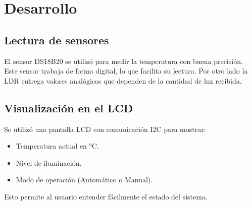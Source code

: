 \documentclass[conference]{IEEEtran}
\begin{document}
\section{Desarrollo}

\subsection{Lectura de sensores}
El sensor DS18B20 se utilizó para medir la temperatura con buena precisión. Este sensor trabaja
de forma digital, lo que facilita su lectura. Por otro lado la LDR entrega valores analógicos
que dependen de la cantidad de luz recibida.

\subsection{Visualización en el LCD}
Se utilizó una pantalla LCD con comunicación I2C para mostrar:
\begin{itemize}
    \item Temperatura actual en °C.
    \item Nivel de iluminación.
    \item Modo de operación (Automático o Manual).
\end{itemize}
Esto permite al usuario entender fácilmente el estado del sistema.
\end{document}
